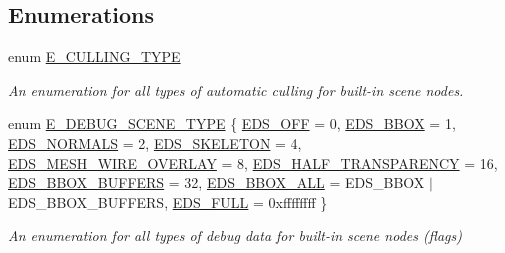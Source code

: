 \subsection*{Enumerations}
\begin{DoxyCompactItemize}
\item 
\mbox{\label{namespaceirr_1_1scene_acabb2772476aa3706e65a7dc77fd9cce}} 
enum \hyperlink{namespaceirr_1_1scene_acabb2772476aa3706e65a7dc77fd9cce}{E\+\_\+\+C\+U\+L\+L\+I\+N\+G\+\_\+\+T\+Y\+PE} \begin{DoxyCompactList}\small\item\em An enumeration for all types of automatic culling for built-\/in scene nodes. \end{DoxyCompactList}
\item 
enum \hyperlink{namespaceirr_1_1scene_a52b664c4c988113735042b168fc32dbe}{E\+\_\+\+D\+E\+B\+U\+G\+\_\+\+S\+C\+E\+N\+E\+\_\+\+T\+Y\+PE} \{ \newline
\hyperlink{namespaceirr_1_1scene_a52b664c4c988113735042b168fc32dbea25111b15f03bee9a99498737286916dc}{E\+D\+S\+\_\+\+O\+FF} = 0, 
\hyperlink{namespaceirr_1_1scene_a52b664c4c988113735042b168fc32dbea19e56bb3d3b18134fa63e0529629b427}{E\+D\+S\+\_\+\+B\+B\+OX} = 1, 
\hyperlink{namespaceirr_1_1scene_a52b664c4c988113735042b168fc32dbea2713e470ee18ec9bfe40fdfb502f8b05}{E\+D\+S\+\_\+\+N\+O\+R\+M\+A\+LS} = 2, 
\hyperlink{namespaceirr_1_1scene_a52b664c4c988113735042b168fc32dbeaa7664e189b8641ac54cf27f70f6d8144}{E\+D\+S\+\_\+\+S\+K\+E\+L\+E\+T\+ON} = 4, 
\newline
\hyperlink{namespaceirr_1_1scene_a52b664c4c988113735042b168fc32dbea349b086537ac770f09935af4e31d3f3e}{E\+D\+S\+\_\+\+M\+E\+S\+H\+\_\+\+W\+I\+R\+E\+\_\+\+O\+V\+E\+R\+L\+AY} = 8, 
\hyperlink{namespaceirr_1_1scene_a52b664c4c988113735042b168fc32dbea1def9e1b7d86e286b07a4b7179e6ed85}{E\+D\+S\+\_\+\+H\+A\+L\+F\+\_\+\+T\+R\+A\+N\+S\+P\+A\+R\+E\+N\+CY} = 16, 
\hyperlink{namespaceirr_1_1scene_a52b664c4c988113735042b168fc32dbea0179a3df80ac09143dfffed0bd9e99d1}{E\+D\+S\+\_\+\+B\+B\+O\+X\+\_\+\+B\+U\+F\+F\+E\+RS} = 32, 
\hyperlink{namespaceirr_1_1scene_a52b664c4c988113735042b168fc32dbea80f38e42f1b8cf169e83f44092367bfe}{E\+D\+S\+\_\+\+B\+B\+O\+X\+\_\+\+A\+LL} = E\+D\+S\+\_\+\+B\+B\+OX $\vert$ E\+D\+S\+\_\+\+B\+B\+O\+X\+\_\+\+B\+U\+F\+F\+E\+RS, 
\newline
\hyperlink{namespaceirr_1_1scene_a52b664c4c988113735042b168fc32dbea24ffe5e6e99d589b3c80181e7c7dd4e2}{E\+D\+S\+\_\+\+F\+U\+LL} = 0xffffffff
 \}\begin{DoxyCompactList}\small\item\em An enumeration for all types of debug data for built-\/in scene nodes (flags) \end{DoxyCompactList}

\end{DoxyCompactItemize}
